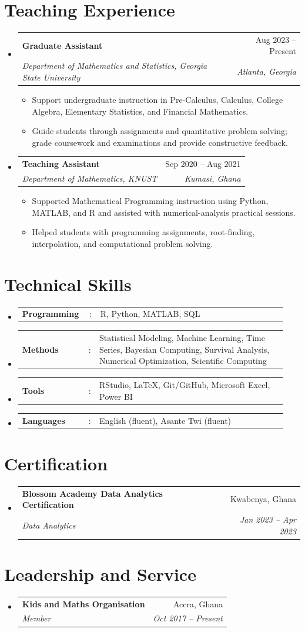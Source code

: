 \documentclass[a4paper,11pt]{article}
\makeatletter
\newcommand{\resumeItem}[1]{\item\small{#1}}
\newcommand{\resumeItemListStart}{\begin{itemize}[leftmargin=0.22in,rightmargin=0.08in,itemsep=1pt,topsep=2pt,parsep=0pt]}
\newcommand{\resumeItemListEnd}{\end{itemize}\vspace{-2pt}}
\newcommand{\resumeSectionType}[3]{\item\begin{tabular*}{0.96\textwidth}[t]{p{0.24\linewidth}p{0.02\linewidth}p{0.68\linewidth}}\textbf{#1} & #2 & #3\end{tabular*}\vspace{-2pt}}
\newcommand{\resumeQuadHeading}[4]{\item\begin{tabular*}{0.96\textwidth}[t]{l@{\extracolsep{\fill}}r}\textbf{#1} & #2 \\\textit{\small #3} & \textit{\small #4} \\\end{tabular*}\vspace{-2pt}}
\newcommand{\resumeHeadingListStart}{\begin{itemize}[leftmargin=0.15in,label={},itemsep=2pt,topsep=2pt]}
\newcommand{\resumeHeadingListEnd}{\end{itemize}\vspace{-2pt}}
\makeatother
\begin{document}
\section{Teaching Experience}
\resumeHeadingListStart
  \resumeQuadHeading{Graduate Assistant}{Aug 2023 -- Present}{Department of Mathematics and Statistics, Georgia State University}{Atlanta, Georgia}
  \resumeItemListStart
    \resumeItem{Support undergraduate instruction in Pre-Calculus, Calculus, College Algebra, Elementary Statistics, and Financial Mathematics.}
    \resumeItem{Guide students through assignments and quantitative problem solving; grade coursework and examinations and provide constructive feedback.}
  \resumeItemListEnd
  \resumeQuadHeading{Teaching Assistant}{Sep 2020 -- Aug 2021}{Department of Mathematics, KNUST}{Kumasi, Ghana}
  \resumeItemListStart
    \resumeItem{Supported Mathematical Programming instruction using Python, MATLAB, and R and assisted with numerical-analysis practical sessions.}
    \resumeItem{Helped students with programming assignments, root-finding, interpolation, and computational problem solving.}
  \resumeItemListEnd
\resumeHeadingListEnd

\section{Technical Skills}
\resumeHeadingListStart
  \resumeSectionType{Programming}{:}{R, Python, MATLAB, SQL}
  \resumeSectionType{Methods}{:}{Statistical Modeling, Machine Learning, Time Series, Bayesian Computing, Survival Analysis, Numerical Optimization, Scientific Computing}
  \resumeSectionType{Tools}{:}{RStudio, LaTeX, Git/GitHub, Microsoft Excel, Power BI}
  \resumeSectionType{Languages}{:}{English (fluent), Asante Twi (fluent)}
\resumeHeadingListEnd

\section{Certification}
\resumeHeadingListStart
  \resumeQuadHeading{Blossom Academy Data Analytics Certification}{Kwabenya, Ghana}{Data Analytics}{Jan 2023 -- Apr 2023}
\resumeHeadingListEnd

\section{Leadership and Service}
\resumeHeadingListStart
  \resumeQuadHeading{Kids and Maths Organisation}{Accra, Ghana}{Member}{Oct 2017 -- Present}
\resumeHeadingListEnd
\end{document}

